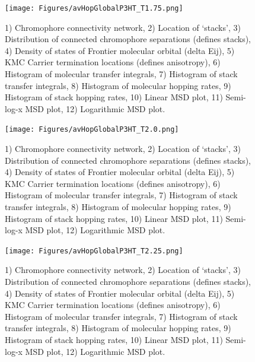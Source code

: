 \documentclass[12pt]{article}
\begin{document}
\begin{figure}[h]\centering
	\texttt{[image: Figures/avHopGlobalP3HT\_T1.75.png]}
    \caption{   1) Chromophore connectivity network, 
                2) Location of `stacks', 
                3) Distribution of connected chromophore separations (defines stacks),
                4) Density of states of Frontier molecular orbital (delta Eij),
                5) KMC Carrier termination locations (defines anisotropy),
                6) Histogram of molecular transfer integrals,
                7) Histogram of stack transfer integrals,
                8) Histogram of molecular hopping rates,
                9) Histogram of stack hopping rates,
                10) Linear MSD plot,
                11) Semi-log-x MSD plot,
                12) Logarithmic MSD plot.}
	\label{fig:avHopGlobalT1.75}
\end{figure}


\begin{figure}[h]\centering
	\texttt{[image: Figures/avHopGlobalP3HT\_T2.0.png]}
    \caption{   1) Chromophore connectivity network, 
                2) Location of `stacks', 
                3) Distribution of connected chromophore separations (defines stacks),
                4) Density of states of Frontier molecular orbital (delta Eij),
                5) KMC Carrier termination locations (defines anisotropy),
                6) Histogram of molecular transfer integrals,
                7) Histogram of stack transfer integrals,
                8) Histogram of molecular hopping rates,
                9) Histogram of stack hopping rates,
                10) Linear MSD plot,
                11) Semi-log-x MSD plot,
                12) Logarithmic MSD plot.}
	\label{fig:avHopGlobalT2.0}
\end{figure}


\begin{figure}[h]\centering
	\texttt{[image: Figures/avHopGlobalP3HT\_T2.25.png]}
    \caption{   1) Chromophore connectivity network, 
                2) Location of `stacks', 
                3) Distribution of connected chromophore separations (defines stacks),
                4) Density of states of Frontier molecular orbital (delta Eij),
                5) KMC Carrier termination locations (defines anisotropy),
                6) Histogram of molecular transfer integrals,
                7) Histogram of stack transfer integrals,
                8) Histogram of molecular hopping rates,
                9) Histogram of stack hopping rates,
                10) Linear MSD plot,
                11) Semi-log-x MSD plot,
                12) Logarithmic MSD plot.}
	\label{fig:avHopGlobalT2.25}
\end{figure}
\end{document}
